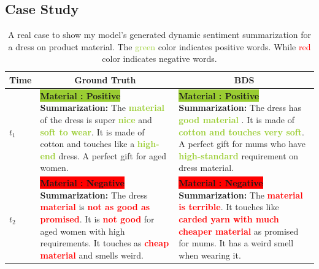 \subsection{Case Study} 
\begin{table}%
	\centering
	
	
	\begin{tabular}{p{1cm}p{6cm}p{6cm}} 
		\toprule
		
		\textbf{Time} & \multicolumn{1}{c}{\textbf{Ground Truth}} & \multicolumn{1}{c}{\textbf{BDS}}\\ \midrule 
		$t_1$ & \colorbox{YellowGreen}{\textbf{Material : Positive}} \newline \textbf{Summarization:} The \textcolor{YellowGreen}{\textbf{material}} of the dress is super \textcolor{YellowGreen}{\textbf{nice}} and  \textcolor{YellowGreen}{\textbf{soft to wear}}. It is made of cotton and touches like a   \textcolor{YellowGreen}{\textbf{high-end}} dress. A perfect gift for aged women. & \colorbox{YellowGreen}{\textbf{Material : Positive }} \newline \textbf{Summarization:} The dress has \textcolor{YellowGreen}{\textbf{good material }}. It is made of \textcolor{YellowGreen}{\textbf{cotton and touches very soft}}. A perfect gift for mums who have \textcolor{YellowGreen}{\textbf{high-standard}} requirement on dress material.\\ \midrule 
		$t_2$ & \colorbox{red}{\textbf{Material : Negative }} \newline \textbf{Summarization:} The dress \textcolor{red}{\textbf{material}} is \textcolor{red}{\textbf{not as good as promised}}. It is \textcolor{red}{\textbf{not good}} for aged women with high requirements. It touches as \textcolor{red}{\textbf{cheap material}} and smells weird. & \colorbox{red}{\textbf{Material : Negative }} \newline \textbf{Summarization:} The \textcolor{red}{\textbf{material is terrible}}. It touches like \textcolor{red}{\textbf{carded yarn with much cheaper material}} as promised for mums. It has a weird smell when wearing it. \\ \bottomrule
	\end{tabular}   
	\caption{A real case to show my model's generated dynamic sentiment summarization for a dress on product material. The \textcolor{YellowGreen}{green} color indicates positive words. While \textcolor{red}{red} color indicates negative words.}
	
	\label{tab:c5_demo} 
\end{table} 
